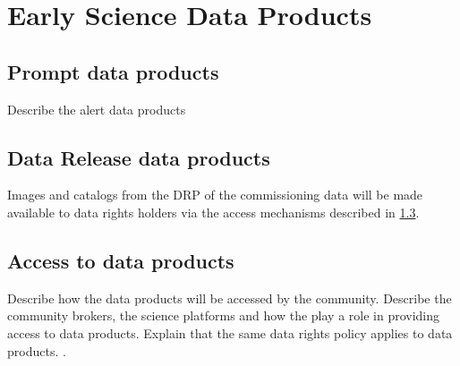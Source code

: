 \section{Early Science Data Products} 
\label{sec:data}

\subsection{Prompt data products}
Describe the alert data products

\subsection{Data Release data products}
Images and catalogs from the DRP of the commissioning data will be made available to  data rights holders via the access mechanisms described in \ref{ssec:dataaccess}.

\subsection{Access to \es data products}\label{ssec:dataaccess}
Describe how the \es  data products will be accessed by the community. 
Describe the community brokers, the science platforms and how the \dpvs play a role in providing access to \es data products. 
Explain that the same data rights policy applies to \es data products. \cite{RDO-013}.


